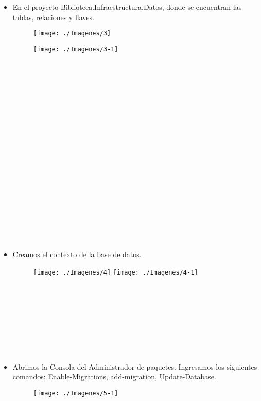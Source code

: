 \documentclass[%
 reprint,
 amsmath,amssymb,
 aps,
]{revtex4-1}
\begin{document}
\begin{itemize}
	\item En el proyecto Biblioteca.Infraestructura.Datos, donde se encuentran las tablas, relaciones y llaves.
\begin{figure}[htb]
\begin{center}
\texttt{[image: ./Imagenes/3]}
\end{center}
\end{figure}
\begin{figure}[htb]
\begin{center}
\texttt{[image: ./Imagenes/3-1]}
\end{center}
\end{figure}
\\
\\
\\
\\
\\
\\
\\
\\
\\
\\
\\
\\
\\
\\
\\
\\
\\
\\
	\item Creamos el contexto de la base de datos.
\begin{figure}[htb]
\begin{center}
\texttt{[image: ./Imagenes/4]}
\texttt{[image: ./Imagenes/4-1]}
\end{center}
\end{figure}\\
\\
\\
\\
\\
\\
\\
	\item Abrimos la Consola del Administrador de paquetes. Ingresamos los siguientes comandos: Enable-Migrations, add-migration, Update-Database.\\
\begin{figure}[htb]
\begin{center}
\texttt{[image: ./Imagenes/5-1]}
\end{center}
\end{figure}

\end{itemize}
\end{document}

